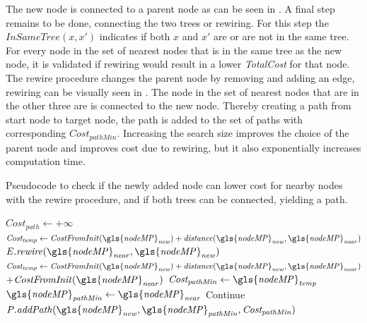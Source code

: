 The new node is connected to a parent node as can be seen in . A final step remains to be done, connecting the two trees or rewiring. For this step the $\mathit{InSameTree}(x, x')$ indicates if both $x$ and $x'$ are or are not in the same tree. For every node in the set of nearest nodes that is in the same tree as the new node, it is validated if rewiring would result in a lower \textit{TotalCost} for that node. The rewire procedure changes the parent node by removing and adding an edge, rewiring can be visually seen in . The node in the set of nearest nodes that are in the other three are is connected to the new node. Thereby creating a path from start node to target node, the path is added to the set of paths with corresponding $\mathit{Cost}_\mathit{pathMin}$. Increasing the search size improves the choice of the parent node and improves cost due to rewiring, but it also exponentially increases computation time.\bs

\begin{algorithm}[H]
\caption{Pseudocode to check if the newly added node can lower cost for nearby nodes with the rewire procedure, and if both trees can be connected, yielding a path.}%
\label{pseudocode:proposed_rrt_star_three}
\begin{algorithmic}[1]
\hspace{-0.9cm}\colorbox{my_green}{\parbox{\linewidth}{%
    \State $\mathit{Cost_{path}} \leftarrow +\infty$
    \State $\mathit{Cost_{temp}} \leftarrow \mathit{CostFromInit(\gls{nodeMP}_{new}) + distance(\gls{nodeMP}_{new}, \gls{nodeMP}_{near})}$
    \State $\mathit{E.rewire(\gls{nodeMP}_{near}, \gls{nodeMP}_{new})}$
        \EndIf
      \Else {}
      \State $\mathit{Cost_{temp} \leftarrow CostFromInit(\gls{nodeMP}_{new}) + distance(\gls{nodeMP}_{new}, \gls{nodeMP}_{near})} $ \newline\hspace*{10em} $+ \mathit{CostFromInit(\gls{nodeMP}_{near})}$
          \State $\mathit{Cost_{pathMin} \leftarrow \gls{nodeMP}_{temp}}$
          \State $\mathit{\gls{nodeMP}_{pathMin} \leftarrow \gls{nodeMP}_{near}}$
          \EndIf
      \EndIf
          \State Continue
      \Else
      \State $\mathit{P.addPath(\gls{nodeMP}_{new}, \gls{nodeMP}_{pathMin}, Cost_{pathMin})}$
      \EndIf
    \EndFor
}}
\end{algorithmic}
\end{algorithm}


